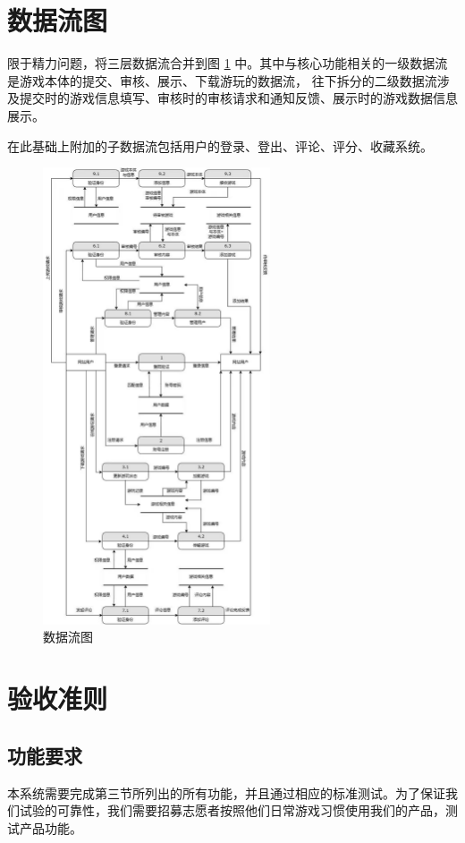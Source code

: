 \documentclass[12pt]{ctexart} %
\begin{document}
\section{数据流图}

限于精力问题，将三层数据流合并到图 \ref{fig:dataflow} 中。其中与核心功能相关的一级数据流是游戏本体的提交、审核、展示、下载游玩的数据流，
往下拆分的二级数据流涉及提交时的游戏信息填写、审核时的审核请求和通知反馈、展示时的游戏数据信息展示。 

在此基础上附加的子数据流包括用户的登录、登出、评论、评分、收藏系统。

\begin{figure}[H]
  \centering
  \includegraphics[width=0.6\textwidth]{dataflow.jpg}
  \caption{数据流图}
  \label{fig:dataflow} %
\end{figure}

\section{验收准则}
\subsection{功能要求}
本系统需要完成第三节所列出的所有功能，并且通过相应的标准测试。为了保证我们试验的可靠性，我们需要招募志愿者按照他们日常游戏习惯使用我们的产品，测试产品功能。
\end{document}
